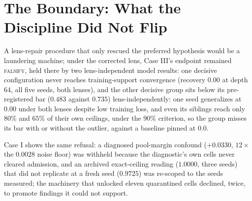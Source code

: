 \section{The Boundary: What the Discipline Did Not Flip}
\label{sec:notflipped}

 A lens-repair procedure that only rescued the preferred hypothesis
would be a laundering machine; under the corrected
lens, Case III's endpoint remained
\textsc{falsify}, held there by two lens-independent model results:
one decisive configuration never reaches training-support convergence
(recovery $0.00$ at depth 64, all five seeds, both
lenses), and the other decisive group sits below its pre-registered
bar ($0.483$ against $0.735$) lens-independently: one seed
generalizes at $0.00$ under both lenses despite low training loss,
and even its siblings reach only $80\%$ and $65\%$ of their own
ceilings, under the $90\%$ criterion, so the group misses its bar
with or without the outlier, against a baseline pinned at $0.0$.

Case I shows the same refusal: a diagnosed pool-margin confound
($+0.0330$, $12\times$ the $0.0028$ noise floor) was withheld because
the diagnostic's own cells never cleared admission, and an archived
exact-ceiling reading ($1.0000$, three seeds) that did not replicate
at a fresh seed ($0.9725$) was re-scoped to the seeds measured; the
machinery that unlocked eleven quarantined cells declined, twice, to
promote findings it could not support.
